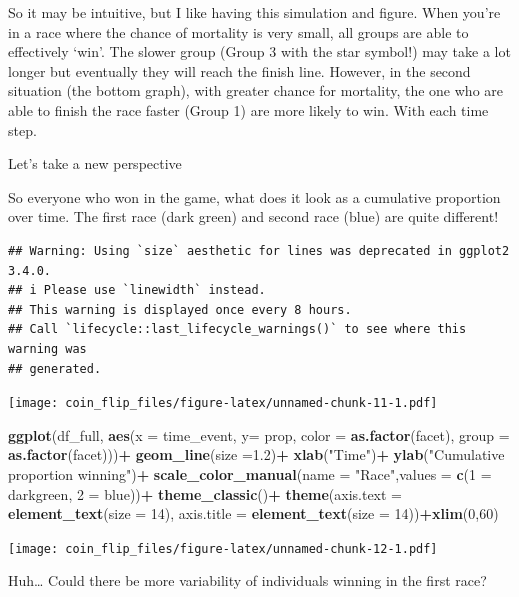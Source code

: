 \documentclass[
]{article}
\newenvironment{Shaded}{\begin{snugshade}}{\end{snugshade}}
\newcommand{\AttributeTok}[1]{\textcolor[rgb]{0.13,0.29,0.53}{#1}}
\newcommand{\DecValTok}[1]{\textcolor[rgb]{0.00,0.00,0.81}{#1}}
\newcommand{\FloatTok}[1]{\textcolor[rgb]{0.00,0.00,0.81}{#1}}
\newcommand{\FunctionTok}[1]{\textcolor[rgb]{0.13,0.29,0.53}{\textbf{#1}}}
\newcommand{\NormalTok}[1]{#1}
\newcommand{\OtherTok}[1]{\textcolor[rgb]{0.56,0.35,0.01}{#1}}
\newcommand{\SpecialCharTok}[1]{\textcolor[rgb]{0.81,0.36,0.00}{\textbf{#1}}}
\newcommand{\StringTok}[1]{\textcolor[rgb]{0.31,0.60,0.02}{#1}}
\begin{document}
So it may be intuitive, but I like having this simulation and figure.
When you're in a race where the chance of mortality is very small, all
groups are able to effectively `win'. The slower group (Group 3 with the
star symbol!) may take a lot longer but eventually they will reach the
finish line. However, in the second situation (the bottom graph), with
greater chance for mortality, the one who are able to finish the race
faster (Group 1) are more likely to win. With each time step.

Let's take a new perspective

So everyone who won in the game, what does it look as a cumulative
proportion over time. The first race (dark green) and second race (blue)
are quite different!

\begin{verbatim}
## Warning: Using `size` aesthetic for lines was deprecated in ggplot2 3.4.0.
## i Please use `linewidth` instead.
## This warning is displayed once every 8 hours.
## Call `lifecycle::last_lifecycle_warnings()` to see where this warning was
## generated.
\end{verbatim}

\texttt{[image: coin\_flip\_files/figure-latex/unnamed-chunk-11-1.pdf]}

\begin{Shaded}
\begin{Highlighting}[]
\FunctionTok{ggplot}\NormalTok{(df\_full, }\FunctionTok{aes}\NormalTok{(}\AttributeTok{x =}\NormalTok{ time\_event, }\AttributeTok{y=}\NormalTok{ prop, }\AttributeTok{color =} \FunctionTok{as.factor}\NormalTok{(facet), }\AttributeTok{group =} \FunctionTok{as.factor}\NormalTok{(facet)))}\SpecialCharTok{+}
 \FunctionTok{geom\_line}\NormalTok{(}\AttributeTok{size =}\FloatTok{1.2}\NormalTok{)}\SpecialCharTok{+}
  \FunctionTok{xlab}\NormalTok{(}\StringTok{"Time"}\NormalTok{)}\SpecialCharTok{+}
  \FunctionTok{ylab}\NormalTok{(}\StringTok{"Cumulative proportion winning"}\NormalTok{)}\SpecialCharTok{+}
  \FunctionTok{scale\_color\_manual}\NormalTok{(}\AttributeTok{name =} \StringTok{"Race"}\NormalTok{,}\AttributeTok{values =} \FunctionTok{c}\NormalTok{(}\StringTok{\textasciigrave{}}\AttributeTok{1}\StringTok{\textasciigrave{}} \OtherTok{=} \StringTok{\textquotesingle{}darkgreen\textquotesingle{}}\NormalTok{, }\StringTok{\textasciigrave{}}\AttributeTok{2}\StringTok{\textasciigrave{}} \OtherTok{=} \StringTok{\textquotesingle{}blue\textquotesingle{}}\NormalTok{))}\SpecialCharTok{+}
  \FunctionTok{theme\_classic}\NormalTok{()}\SpecialCharTok{+}
 \FunctionTok{theme}\NormalTok{(}\AttributeTok{axis.text =} \FunctionTok{element\_text}\NormalTok{(}\AttributeTok{size =} \DecValTok{14}\NormalTok{),}
        \AttributeTok{axis.title =} \FunctionTok{element\_text}\NormalTok{(}\AttributeTok{size =} \DecValTok{14}\NormalTok{))}\SpecialCharTok{+}\FunctionTok{xlim}\NormalTok{(}\DecValTok{0}\NormalTok{,}\DecValTok{60}\NormalTok{)}
\end{Highlighting}
\end{Shaded}

\texttt{[image: coin\_flip\_files/figure-latex/unnamed-chunk-12-1.pdf]}

Huh\ldots{} Could there be more variability of individuals winning in
the first race?
\end{document}
